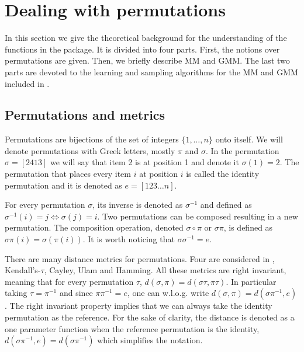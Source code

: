 \documentclass[article,nojss]{jss}
\begin{document}
\section{Dealing with permutations}%
\label{sec:permus_models}
In this section we give the theoretical background for the understanding of the functions in the  package. It is divided into four parts. First, the notions over permutations are given. Then, we briefly describe MM and GMM. The last two parts are devoted to the learning and sampling algorithms for the MM and GMM included in .

\subsection{Permutations and metrics}
\label{sec:permus}
Permutations are bijections of the set of integers $\{1, \ldots , n\}$ onto itself. We will denote permutations with Greek letters, mostly $\pi$ and $\sigma$. In the permutation $\sigma=[2413]$ we will say that item 2 is at position 1 and denote it $\sigma(1)=2$. The permutation that places every item $i$ at position $i$ is called the identity permutation and it is denoted as $e=[123\ldots n]$. 

For every permutation $\sigma$, its inverse is denoted as $\sigma^{-1}$ and defined as $\sigma^{-1}(i)=j \Leftrightarrow \sigma(j)=i$. Two permutations can be composed resulting in a new permutation. The composition operation, denoted $\sigma \circ \pi$ or $\sigma \pi$, is defined as  $\sigma \pi(i) = \sigma(\pi(i))$. It is worth noticing that $\sigma \sigma^{-1} = e$.

There are many distance metrics for permutations. Four are considered in , Kendall's-$\tau$, Cayley, Ulam and Hamming. All these metrics are right invariant, meaning that for every permutation $\tau$, $d(\sigma, \pi)=d(\sigma \tau, \pi \tau)$. In particular taking $\tau=\pi^{-1}$ and since $\pi \pi^{-1}=e$, one can w.l.o.g. write $d(\sigma, \pi)=d(\sigma \pi^{-1}, e)$. The right invariant property implies that we can always take the identity permutation as the reference. For the sake of clarity, the distance is denoted as a one parameter function when the reference permutation is the identity, $d(\sigma \pi^{-1}, e) = d(\sigma \pi^{-1})$ which simplifies the notation. 
\end{document}
